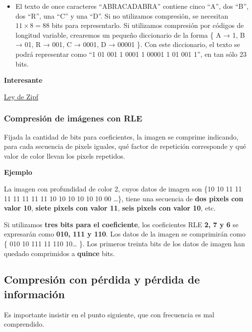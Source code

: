 \documentclass[spanish,a4paper,]{article}
\providecommand{\tightlist}{%
  \setlength{\itemsep}{0pt}\setlength{\parskip}{0pt}}
\begin{document}
\begin{itemize}
\tightlist
\item
  El texto de once caracteres ``ABRACADABRA'' contiene cinco ``A'', dos
  ``B'', dos ``R'', una ``C'' y una ``D''. Si no utilizamos compresión,
  se necesitan \(11 \times 8 = 88\) bits para representarlo. Si
  utilizamos compresión por códigos de longitud variable, crearemos un
  pequeño diccionario de la forma \{ A → 1, B → 01, R → 001, C → 0001, D
  → 00001 \}. Con este diccionario, el texto se podrá representar como
  ``1 01 001 1 0001 1 00001 1 01 001 1'', en tan sólo 23 bits.
\end{itemize}

\textbf{Interesante}

\href{https://es.m.wikipedia.org/wiki/Ley_de_Zipf}{Ley de Zipf}

\hypertarget{compresiuxf3n-de-imuxe1genes-con-rle}{%
\subsubsection{Compresión de imágenes con
RLE}\label{compresiuxf3n-de-imuxe1genes-con-rle}}

Fijada la cantidad de bits para coeficientes, la imagen se comprime
indicando, para cada secuencia de pixels iguales, qué factor de
repetición corresponde y qué valor de color llevan los pixels repetidos.

\textbf{Ejemplo}

La imagen con profundidad de color 2, cuyos datos de imagen son \{10 10
11 11 11 11 11 11 11 10 10 10 10 10 10 00 \ldots{}\}, tiene una
secuencia de \textbf{dos pixels con valor 10}, \textbf{siete pixels con
valor 11}, \textbf{seis pixels con valor 10}, etc.

Si utilizamos \textbf{tres bits para el coeficiente}, los coeficientes
RLE \textbf{2, 7 y 6} se expresarán como \textbf{010, 111 y 110}. Los
datos de la imagen se comprimirán como \{ 010 10 111 11 110 10\ldots{}
\}. Los primeros treinta bits de los datos de imagen han quedado
comprimidos a \textbf{quince} bits.

\hypertarget{compresiuxf3n-con-puxe9rdida-y-puxe9rdida-de-informaciuxf3n}{%
\subsection{Compresión con pérdida y pérdida de
información}\label{compresiuxf3n-con-puxe9rdida-y-puxe9rdida-de-informaciuxf3n}}

Es importante insistir en el punto siguiente, que con frecuencia es mal
comprendido.
\end{document}
